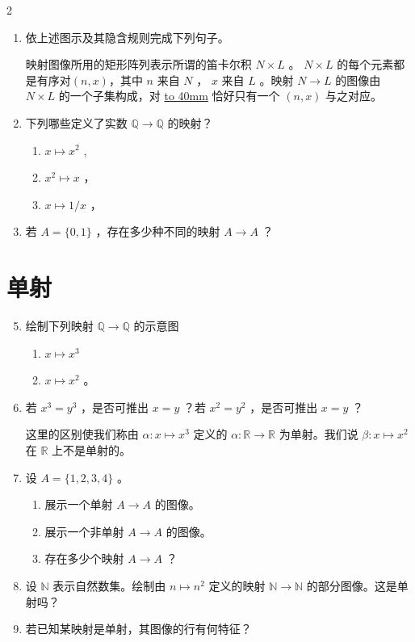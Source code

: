 \documentclass[12pt]{ctexart}
\begin{document}
\begin{multicols}{2}
\begin{enumerate}
\item 依上述图示及其隐含规则完成下列句子。

  映射图像所用的矩形阵列表示所谓的笛卡尔积 \(N \times  L\) 。 \(N \times  L\) 的每个元素都是有序对$(n, x)$，其中 \(n\) 来自 \(N\) ， \(x\) 来自 \(L\) 。映射 \(N \rightarrow  L\) 的图像由 \(N \times  L\) 的一个子集构成，对 \underline{\hbox to 40mm{}} 恰好只有一个 $(n, x)$ 与之对应。

\item 下列哪些定义了实数 \(\mathbb{Q} \rightarrow  \mathbb{Q}\) 的映射？
\begin{enumerate}
\item \(x \mapsto  {x}^{2}\) ,
\item  \({x}^{2} \mapsto  x\) ，
\item  \(x \mapsto  1/x\) ，
\end{enumerate}

\item  若 \(A = \{ 0,1\}\) ，存在多少种不同的映射 \(A \rightarrow  A\) ？

\end{enumerate}





\section*{单射}

\begin{enumerate}
  \setcounter{enumi}{4}
\item 绘制下列映射 \(\mathbb{Q} \rightarrow  \mathbb{Q}\) 的示意图
\begin{enumerate}
\item  \(x \mapsto  {x}^{3}\) 
\item  \(x \mapsto  {x}^{2}\) 。
\end{enumerate}
\item 若 \({x}^{3} = {y}^{3}\) ，是否可推出 \(x = y\) ？若 \({x}^{2} = {y}^{2}\) ，是否可推出 \(x = y\) ？

这里的区别使我们称由 \(\alpha  : x \mapsto  {x}^{3}\) 定义的 \(\alpha  : \mathbb{R} \rightarrow  \mathbb{R}\) 为单射。我们说 \(\beta  : x \mapsto  {x}^{2}\) 在 \(\mathbb{R}\) 上不是单射的。

\item 设 \(A = \{ 1,2,3,4\}\) 。
  \begin{enumerate}
  \item 展示一个单射 \(A \rightarrow  A\) 的图像。
  \item 展示一个非单射 \(A \rightarrow  A\) 的图像。
  \item 存在多少个映射 \(A \rightarrow  A\) ？
  \end{enumerate}
\item 设 \(\mathbb{N}\) 表示自然数集。绘制由 \(n \mapsto  {n}^{2}\) 定义的映射 \(\mathbb{N} \rightarrow  \mathbb{N}\) 的部分图像。这是单射吗？
\item 若已知某映射是单射，其图像的行有何特征？
\end{enumerate}



\end{multicols}
\end{document}
